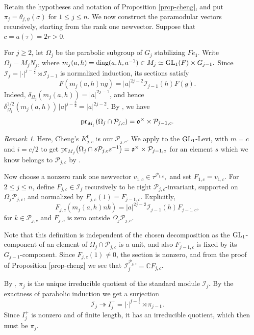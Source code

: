 \documentclass[12pt]{amsart}
\theoremstyle{definition}
\theoremstyle{remark}
\newtheorem{remark}{Remark}
\begin{document}
Retain the hypotheses and notation of Proposition \ref{prop-cheng}, and put $\pi_j=\theta_{j,\psi}(\sigma)$ for $1\le j\le n$. We now construct the paramodular vectors recursively, starting from the rank one newvector. Suppose that $c=a(\tau)=2r>0$.

For $j\geq 2$, let $\Omega_j$ be the parabolic subgroup of $G_j$ stabilizing $Fe_1$. Write $\Omega_j=M_jN_j$, where
$
m_j(a,h)={\rm diag}(a,h,a^{-1})\in M_j
\simeq {\rm GL}_1(F)\times G_{j-1}.
$
Since $\mathcal I_j=|\cdot|^{j-\frac{3}{2}}\rtimes\mathcal I_{j-1}$ is normalized induction, its sections satisfy
\[
F(m_j(a,h)ng)
=
|a|^{2j-2}\mathcal I_{j-1}(h)F(g).
\]
Indeed, $\delta_{\Omega_j}(m_j(a,h))=|a|^{2j-1}$, and hence
$
\delta_{\Omega_j}^{1/2}(m_j(a,h))\,|a|^{j-\frac{3}{2}}
=
|a|^{2j-2}.
$
By \cite[Corollaries 3.3 and 5.2]{che26}, we have
\[
{\rm pr}_{M_j}(\Omega_j\cap\mathcal P_{j,c})
=
\mathfrak o^\times\times\mathcal P_{j-1,c}.
\]
\begin{remark}
Here, Cheng’s $K^0_{j,c}$ is our $\mathcal P_{j,c}$. We apply \cite[Corollary 5.2]{che26} to the ${\rm GL}_1$-Levi, with $m=c$ and $i=c/2$ to get
${\rm pr}_{M_j} \bigl(\Omega_j\cap s\mathcal P_{j,c} s^{-1}\bigr) = \mathfrak o^\times\times\mathcal P_{j-1,c}$ for an element $s$ which we know belongs to $\mathcal P_{j,c}$ by \cite[Corollary 3.3]{che26}.
\end{remark}
Now choose a nonzero rank one newvector
$
v_{1,c}\in\tau^{\mathcal P_{1,c}},
$
and set $F_{1,c}=v_{1,c}$. For $2\leq j\leq n$, define $F_{j,c}\in\mathcal I_j$ recursively to be right $\mathcal P_{j,c}$-invariant, supported on $\Omega_j\mathcal P_{j,c}$, and normalized by
$
F_{j,c}(1)=F_{j-1,c}.
$
Explicitly,
\begin{equation}\label{eq-paranormal}
F_{j,c}(m_j(a,h)nk)
=
|a|^{2j-2}\mathcal I_{j-1}(h)F_{j-1,c},
\end{equation}
for $k\in\mathcal P_{j,c}$ 
and $F_{j,c}$ is zero outside $\Omega_j\mathcal P_{j,c}$.

Note that this definition is independent of the chosen decomposition as the ${\rm GL}_1$-component of an element of $\Omega_j\cap\mathcal P_{j,c}$ is a unit, and also $F_{j-1,c}$ is fixed by its $G_{j-1}$-component. Since $F_{j,c}(1)\neq0$, the section is nonzero, and from the proof of Proposition \ref{prop-cheng} we see that $\mathcal I_j^{\mathcal P_{j,c}}=\mathbb C F_{j,c}$.

By \cite[Proposition 3.2]{gt16}, $\pi_j$ is the unique irreducible quotient of the standard module $\mathcal I_j$. By the exactness of parabolic induction we get a surjection
\[
\mathcal I_j\twoheadrightarrow
I_j^+=|\cdot|^{j-\frac{3}{2}}\rtimes\pi_{j-1}.
\]
Since $I_j^+$ is nonzero and of finite length, it has an irreducible quotient, which then must be $\pi_j$.
\end{document}
